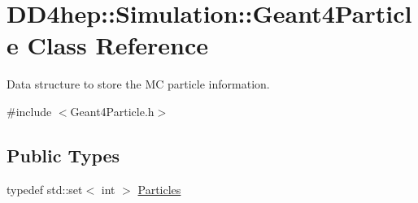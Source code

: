 \hypertarget{class_d_d4hep_1_1_simulation_1_1_geant4_particle}{
\section{DD4hep::Simulation::Geant4Particle Class Reference}
\label{class_d_d4hep_1_1_simulation_1_1_geant4_particle}
}


Data structure to store the MC particle information.  


{\ttfamily \#include $<$Geant4Particle.h$>$}\subsection*{Public Types}
\begin{DoxyCompactItemize}
\item 
typedef std::set$<$ int $>$ \hyperlink{class_d_d4hep_1_1_simulation_1_1_geant4_particle_a123ad778eff51ea80ce778d54776c072}{Particles}
\end{DoxyCompactItemize}
